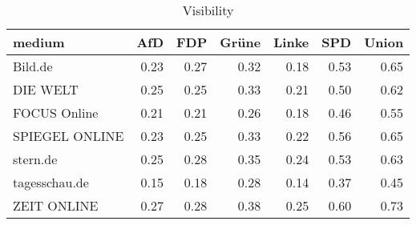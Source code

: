 \begin{table}[ht]
\centering
\begin{tabular}{lrrrrrr}
  \hline
medium & AfD & FDP & Grüne & Linke & SPD & Union \\ 
  \hline
Bild.de & 0.23 & 0.27 & 0.32 & 0.18 & 0.53 & 0.65 \\ 
  DIE WELT & 0.25 & 0.25 & 0.33 & 0.21 & 0.50 & 0.62 \\ 
  FOCUS Online & 0.21 & 0.21 & 0.26 & 0.18 & 0.46 & 0.55 \\ 
  SPIEGEL ONLINE & 0.23 & 0.25 & 0.33 & 0.22 & 0.56 & 0.65 \\ 
  stern.de & 0.25 & 0.28 & 0.35 & 0.24 & 0.53 & 0.63 \\ 
  tagesschau.de & 0.15 & 0.18 & 0.28 & 0.14 & 0.37 & 0.45 \\ 
  ZEIT ONLINE & 0.27 & 0.28 & 0.38 & 0.25 & 0.60 & 0.73 \\ 
   \hline
\end{tabular}
\caption{Visibility} 
\end{table}
